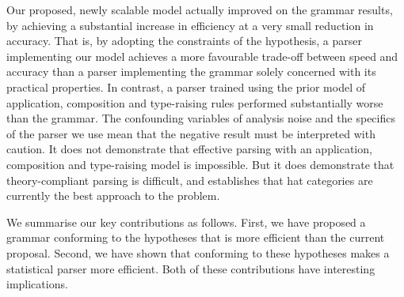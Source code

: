 Our proposed, newly scalable \ccg model actually improved on the \ccgbank
grammar results, by achieving a substantial increase in efficiency at a very
small reduction in accuracy. That is, by adopting the constraints of the \ccg
hypothesis, a parser implementing our model achieves a more favourable trade-off
between speed and accuracy than a
parser implementing the grammar solely concerned with its practical properties.
In contrast, a parser trained using the prior \ccg model of application,
composition and type-raising rules performed substantially worse than the \ccgbank
grammar. The confounding variables of analysis noise and the specifics of the
\ccg parser we use mean that the negative result must be interpreted with
caution. It does not demonstrate that effective parsing with an application,
composition and type-raising model is impossible. But it does demonstrate that
\ccg theory-compliant parsing is difficult, and establishes that hat categories
are currently the best approach to the problem.

We summarise our key contributions as follows. First, we have proposed a grammar
conforming to the \ccg hypotheses that is more efficient than the current
proposal. Second, we have shown that conforming to these hypotheses makes a
statistical parser more efficient. Both of these contributions have interesting
implications.


